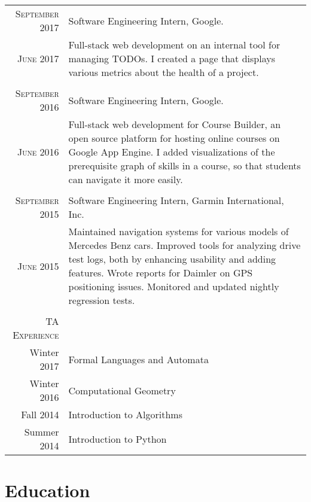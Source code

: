 \documentclass[a4paper,10pt]{article} %
\begin{document}
\begin{tabular}{r|p{11cm}}

\textsc{September 2017} & Software Engineering Intern, Google. \\
\textsc{June 2017} & Full-stack web development on an internal tool for managing TODOs. I created a page that displays various metrics about the health of a project. \\

& \\

\textsc{September 2016} & Software Engineering Intern, Google. \\
\textsc{June 2016} & Full-stack web development for Course Builder, an open source platform for hosting online courses on Google App Engine. I added visualizations of the prerequisite graph of skills in a course, so that students can navigate it more easily. \\

& \\

\textsc{September 2015} & Software Engineering Intern, Garmin International, Inc. \\
\textsc{June 2015} & Maintained navigation systems for various models of Mercedes Benz cars. Improved tools for analyzing drive test logs, both by enhancing usability and adding features. Wrote reports for Daimler on GPS positioning issues. Monitored and updated nightly regression tests.\\
\multicolumn{2}{c}{} \\


\textsc{TA Experience} & \\
Winter 2017 & Formal Languages and Automata \\
Winter 2016 & Computational Geometry \\
Fall 2014 & Introduction to Algorithms \\
Summer 2014 & Introduction to Python \\

\end{tabular}


\section{Education}
\end{document}
